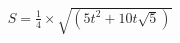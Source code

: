 \documentclass[preview]{standalone}
\begin{document}
\begin{align*}
S = \frac{1}{4} \times \sqrt{(5t^2 + 10t\sqrt{5})}
\end{align*}
\end{document}
